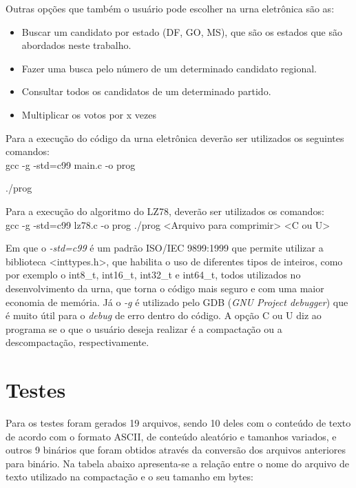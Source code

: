 \documentclass[
	article,			
	11pt,				
	oneside,			
	a4paper,			
	english,			
	brazil,				
	sumario=tradicional
	]{abntex2}
\newenvironment{myfont}{\fontfamily{pcr}\selectfont}{\par}
\begin{document}
Outras opções que também o usuário pode escolher na urna eletrônica são as:
\begin{itemize}
\item Buscar um candidato por estado (DF, GO, MS), que são os estados que são abordados neste trabalho.
\item Fazer uma busca pelo número de um determinado candidato regional.
\item Consultar todos os candidatos de um determinado partido.
\item Multiplicar os votos por x vezes
\end{itemize}

Para a execução do código da urna eletrônica deverão ser utilizados os seguintes comandos:\\

\begin{myfont}
{\footnotesize gcc -g -std=c99 main.c -o prog}

{\footnotesize ./prog}\\
\end{myfont}

Para a execução do algoritmo do LZ78, deverão ser utilizados os comandos:\\

\begin{myfont} \hfill
{\footnotesize gcc -g -std=c99 lz78.c -o prog}
{\footnotesize ./prog <Arquivo para comprimir> <C ou U>}\\
\end{myfont}

Em que o \textit{-std=c99} é um padrão ISO/IEC 9899:1999 que permite utilizar a biblioteca <inttypes.h>, que habilita o uso de diferentes tipos de inteiros, como por exemplo o int8\_t, int16\_t, int32\_t e int64\_t, todos utilizados no desenvolvimento da urna, que torna o código mais seguro e com uma maior economia de memória. Já o \textit{-g} é utilizado pelo GDB (\textit{GNU Project debugger}) que é muito útil para o \textit{debug} de erro dentro do código. A opção C ou U diz ao programa se o que o usuário deseja realizar é a compactação ou a descompactação, respectivamente.

\section{Testes}
Para os testes foram gerados 19 arquivos, sendo 10 deles com o conteúdo de texto de acordo com o formato ASCII, de conteúdo aleatório e tamanhos variados, e outros 9 binários que foram obtidos através da conversão dos arquivos anteriores para binário. Na tabela abaixo apresenta-se a relação entre o nome do arquivo de texto utilizado na compactação e o seu tamanho em bytes:
\end{document}
